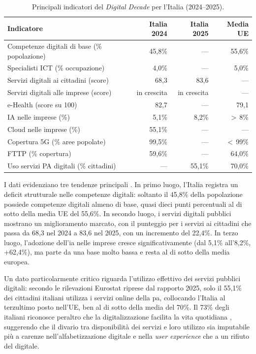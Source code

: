 \begin{table}[H]
\centering
\caption{Principali indicatori del \textit{Digital Decade} per l'Italia (2024--2025).}
\label{tab:desi-italia}
\begin{tabularx}{\textwidth}{X r r r}
\toprule
\textbf{Indicatore} & \textbf{Italia 2024} & \textbf{Italia 2025} & \textbf{Media UE} \\
\midrule
Competenze digitali di base (\% popolazione) & 45,8\% & --- & 55,6\% \\
Specialisti ICT (\% occupazione) & 4,0\% & --- & 5,0\% \\
Servizi digitali ai cittadini (score) & 68,3 & 83,6 & --- \\
Servizi digitali alle imprese (score) & in crescita & in crescita & --- \\
e-Health (score su 100) & 82,7 & --- & 79,1 \\
IA nelle imprese (\%) & 5,1\% & 8,2\% & $>$\,8\% \\
Cloud nelle imprese (\%) & 55,1\% & --- & --- \\
Copertura 5G (\% aree popolate) & 99,5\% & --- & $<$\,99\% \\
FTTP (\% copertura) & 59,6\% & --- & 64,0\% \\
Uso servizi PA digitali (\% cittadini) & --- & 55,1\% & 70,0\% \\
\bottomrule
\end{tabularx}
\end{table}

I dati evidenziano tre tendenze principali \parencite{ItalyDigitalDecade2024,ItalyDigitalDecade2025}. In primo luogo, l'Italia registra un deficit strutturale nelle competenze digitali: soltanto il 45,8\% della popolazione possiede competenze digitali almeno di base, quasi dieci punti percentuali al di sotto della media UE del 55,6\%. In secondo luogo, i servizi digitali pubblici mostrano un miglioramento marcato, con il punteggio per i servizi ai cittadini che passa da 68,3 nel 2024 a 83,6 nel 2025, con un incremento del 22,4\%. In terzo luogo, l'adozione dell'\gls{ia} nelle imprese cresce significativamente (dal 5,1\% all'8,2\%, +62,4\%), ma parte da una base molto bassa e resta al di sotto della media europea.

Un dato particolarmente critico riguarda l'utilizzo effettivo dei servizi pubblici digitali: secondo le rilevazioni Eurostat riprese dal rapporto 2025, solo il 55,1\% dei cittadini italiani utilizza i servizi online della \gls{pa}, collocando l'Italia al terzultimo posto nell'UE, ben al di sotto della media del 70\%. Il 73\% degli italiani riconosce peraltro che la digitalizzazione facilita la vita quotidiana \parencite{EurostatDigitalPA2025,ItalyDigitalDecade2025}, suggerendo che il divario tra disponibilità dei servizi e loro utilizzo sia imputabile più a carenze nell'alfabetizzazione digitale e nella \textit{user experience} che a un rifiuto del digitale.

